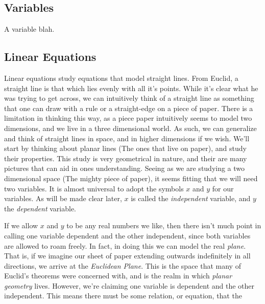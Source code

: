 \documentclass[crop=false,class=book,oneside]{standalone}                      %
\begin{document}
        \subsection{Variables}
            A variable blah.
        \subsection{Linear Equations}
            Linear equations study equations that model straight lines.
            From Euclid, a straight line is that which lies evenly with all
            it's points. While it's clear what he was trying to get across, we
            can intuitively think of a straight line as something that one can
            draw with a rule or a straight-edge on a piece of paper. There is
            a limitation in thinking this way, as a piece paper intuitively
            seems to model two dimensions, and we live in a three dimensional
            world. As such, we can generalize and think of straight lines in
            space, and in higher dimensions if we wish. We'll start by thinking
            about planar lines (The ones that live on paper), and study their
            properties. This study is very geometrical in nature, and their are
            many pictures that can aid in ones understanding. Seeing as we are
            studying a two dimensional space (The mighty piece of paper), it
            seems fitting that we will need two variables. It is almost
            universal to adopt the symbols $x$ and $y$ for our variables. As
            will be made clear later, $x$ is called the \textit{independent}
            variable, and $y$ the \textit{dependent} variable.
            \par\hfill\par
            If we allow $x$ and $y$ to be any real numbers we like, then there
            isn't much point in calling one variable dependent and the other
            independent, since both variables are allowed to roam freely.
            In fact, in doing this we can model the real \textit{plane}. That
            is, if we imagine our sheet of paper extending outwards indefinitely
            in all directions, we arrive at the \textit{Euclidean Plane}. This
            is the space that many of Euclid's theorems were concerned with,
            and is the realm in which \textit{planar geometry} lives. However,
            we're claiming one variable is dependent and the other independent.
            This means there must be some relation, or equation, that the
\end{document}

